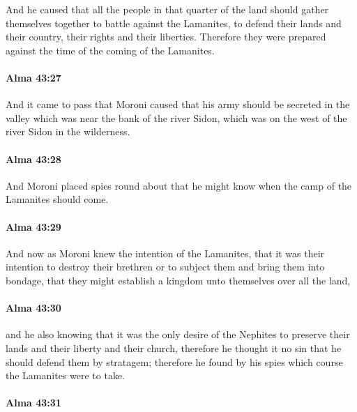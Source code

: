 			And he caused that all the people in that quarter of the land
			should gather themselves together to battle against the Lamanites,
			to defend their lands and their country, their rights and their liberties.
			Therefore they were prepared against the time of the coming of the Lamanites.

		\paragraph{Alma 43:27} %
			\label{ALMA-43-27}

			And it came to pass that Moroni caused
			that his army should be secreted in the valley
			which was near the bank of the river Sidon,
			which was on the west of the river Sidon in the wilderness.

		\paragraph{Alma 43:28} %
			\label{ALMA-43-28}

			And Moroni placed spies round about
			that he might know when the camp of the Lamanites should come.

		\paragraph{Alma 43:29} %
			\label{ALMA-43-29}

			And now as Moroni knew the intention of the Lamanites,
			that it was their intention to destroy their brethren
			or to subject them and bring them into bondage,
			that they might establish a kingdom unto themselves over all the land,

		\paragraph{Alma 43:30} %
			\label{ALMA-43-30}

			and he also knowing that it was the only desire of the Nephites
			to preserve their lands and their liberty and their church,
			therefore he thought it no sin that he should defend them by stratagem;
			therefore he found by his spies which course the Lamanites were to take.

		\paragraph{Alma 43:31} %
			\label{ALMA-43-31}

